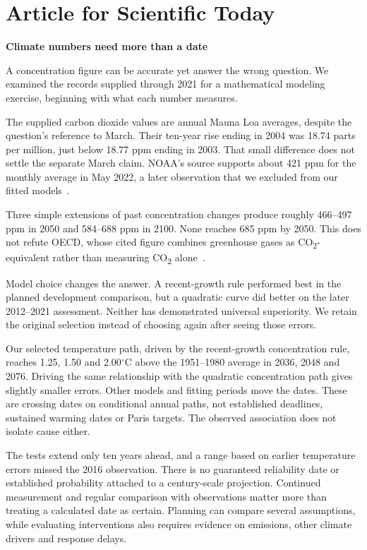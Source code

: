 \documentclass[11pt,a4paper]{article}
\newcommand{\p}[2]{#2\par}
\newcommand{\CO}{CO\textsubscript{2}}
\newcommand{\degC}{\ensuremath{{}^{\circ}\mathrm{C}}}
\begin{document}
\section{Article for Scientific Today}\label{sec:article}
\begin{center}{\large\bfseries Climate numbers need more than a date}\end{center}
\p{ART01}{A concentration figure can be accurate yet answer the wrong question. We examined the records supplied through 2021 for a mathematical modeling exercise, beginning with what each number measures.}
\p{ART02}{The supplied carbon dioxide values are annual Mauna Loa averages, despite the question's reference to March. Their ten-year rise ending in 2004 was 18.74 parts per million, just below 18.77 ppm ending in 2003. That small difference does not settle the separate March claim. NOAA's source supports about 421 ppm for the monthly average in May 2022, a later observation that we excluded from our fitted models~\cite{problem,workbook,noaa-data,noaa-news}.}
\p{ART03}{Three simple extensions of past concentration changes produce roughly 466--497 ppm in 2050 and 584--688 ppm in 2100. None reaches 685 ppm by 2050. This does not refute OECD, whose cited figure combines greenhouse gases as \CO{}-equivalent rather than measuring \CO{} alone~\cite{oecd}.}
\p{ART04}{Model choice changes the answer. A recent-growth rule performed best in the planned development comparison, but a quadratic curve did better on the later 2012--2021 assessment. Neither has demonstrated universal superiority. We retain the original selection instead of choosing again after seeing those errors.}
\p{ART05}{Our selected temperature path, driven by the recent-growth concentration rule, reaches 1.25, 1.50 and 2.00\degC{} above the 1951--1980 average in 2036, 2048 and 2076. Driving the same relationship with the quadratic concentration path gives slightly smaller errors. Other models and fitting periods move the dates. These are crossing dates on conditional annual paths, not established deadlines, sustained warming dates or Paris targets. The observed association does not isolate cause either.}
\p{ART06}{The tests extend only ten years ahead, and a range based on earlier temperature errors missed the 2016 observation. There is no guaranteed reliability date or established probability attached to a century-scale projection. Continued measurement and regular comparison with observations matter more than treating a calculated date as certain. Planning can compare several assumptions, while evaluating interventions also requires evidence on emissions, other climate drivers and response delays.}
\end{document}
